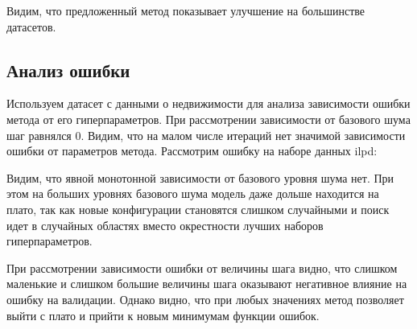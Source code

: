 \documentclass[a4paper,12pt]{article}
\begin{document}
\vspace{15px}

Видим, что предложенный метод показывает улучшение на большинстве датасетов.

\subsection{Анализ ошибки}
 
Используем датасет с данными о недвижимости для анализа зависимости ошибки метода от его гиперпараметров.
При рассмотрении зависимости от базового шума шаг равнялся 0. Видим, что на малом числе итераций нет значимой зависимости ошибки от параметров метода. Рассмотрим ошибку на наборе данных ilpd:


Видим, что явной монотонной зависимости от базового уровня шума нет. При этом на больших уровнях базового шума модель даже дольше находится на плато, так как новые конфигурации становятся слишком случайными и поиск идет в случайных областях вместо окрестности лучших наборов гиперпараметров.

При рассмотрении зависимости ошибки от величины шага видно, что слишком маленькие и слишком большие величины шага оказывают негативное влияние на ошибку на валидации. Однако видно, что при любых значениях метод позволяет выйти с плато и прийти к новым минимумам функции ошибок.
\end{document}
